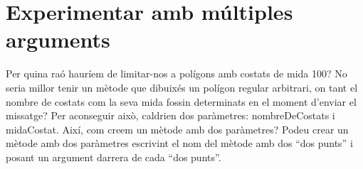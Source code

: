 
\section{Experimentar amb múltiples arguments}
Per quina raó hauríem de limitar-nos a polígons amb costats de mida 100? No seria millor tenir un mètode que dibuixés un polígon regular arbitrari, on tant el nombre de costats com la seva mida fossin determinats en el moment d'enviar el missatge? Per aconseguir això, caldrien dos paràmetres: \textsf{nombreDeCostats} i \textsf{midaCostat}. Així, com creem un mètode amb dos paràmetres? Podeu crear un mètode amb dos paràmetres escrivint el nom del mètode amb dos ``dos punts'' i posant un argument darrera de cada ``dos punts''.

